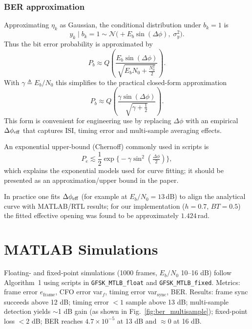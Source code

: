 \documentclass[conference]{IEEEtran}
\begin{document}
\subsubsection{BER approximation}
Approximating $\eta_k$ as Gaussian, the conditional distribution under $b_k=1$ is
\begin{equation}
\tag{X-25}
y_k\mid b_k=1\sim\mathcal{N}\big(+E_b\sin(\Delta\phi),\;\sigma_y^2\big).
\end{equation}
Thus the bit error probability is approximated by
\begin{equation}
\tag{X-26}
P_b\approx Q\!\left(\frac{E_b\sin(\Delta\phi)}{\sqrt{E_bN_0+\frac{N_0^2}{2}}}\right).
\end{equation}
With $\gamma\triangleq E_b/N_0$ this simplifies to the practical closed-form approximation
\begin{equation}
\tag{X-28}
P_b\approx Q\!\left(\frac{\gamma\sin(\Delta\phi)}{\sqrt{\gamma+\tfrac12}}\right).
\end{equation}
This form is convenient for engineering use by replacing $\Delta\phi$ with an empirical $\Delta\phi_{\rm eff}$ that captures ISI, timing error and multi-sample averaging effects.

An exponential upper-bound (Chernoff) commonly used in scripts is
\begin{equation}
\tag{X-33}
P_e\lesssim\frac12\exp\big\{-\gamma\sin^2(\tfrac{\Delta\phi}{2})\big\},
\end{equation}
which explains the exponential models used for curve fitting; it should be presented as an approximation/upper bound in the paper.

In practice one fits $\Delta\phi_{\rm eff}$ (for example at $E_b/N_0=13\,$dB) to align the analytical curve with MATLAB/RTL results; for our implementation ($h=0.7$, $BT=0.5$) the fitted effective opening was found to be approximately $1.424\,$rad.

\section{MATLAB Simulations}
Floating- and fixed-point simulations (1000 frames, $E_b/N_0$ 10--16 dB) follow Algorithm~1 using scripts in \texttt{GFSK\_MTLB\_float} and \texttt{GFSK\_MTLB\_fixed}. Metrics: frame error $e_{\text{frame}}$, CFO error var$_f$, timing error var$_{\text{sync}}$, BER. Results: frame sync succeeds above 12 dB; timing error $<1$ sample above 13 dB; multi-sample detection yields $\sim$1 dB gain (as shown in Fig.~\ref{fig:ber_multisample}); fixed-point loss $<2$ dB; BER reaches $4.7\times10^{-5}$ at 13 dB and $\approx0$ at 16 dB.
\end{document}
